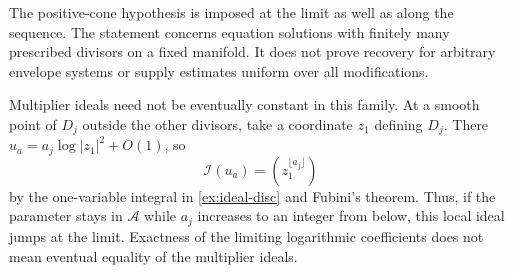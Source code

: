 The positive-cone hypothesis is imposed at the limit as well as along the sequence. The statement concerns equation solutions with finitely many prescribed divisors on a fixed manifold. It does not prove recovery for arbitrary envelope systems or supply estimates uniform over all modifications.

Multiplier ideals need not be eventually constant in this family. At a smooth point of $D_j$ outside the other divisors, take a coordinate $z_1$ defining $D_j$. There $u_a=a_j\log|z_1|^2+O(1)$, so
\[
 \mathcal I(u_a)=(z_1^{\lfloor a_j\rfloor})
\]
by the one-variable integral in \cref{ex:ideal-disc} and Fubini's theorem. Thus, if the parameter stays in $\mathcal A$ while $a_j$ increases to an integer from below, this local ideal jumps at the limit. Exactness of the limiting logarithmic coefficients does not mean eventual equality of the multiplier ideals.
